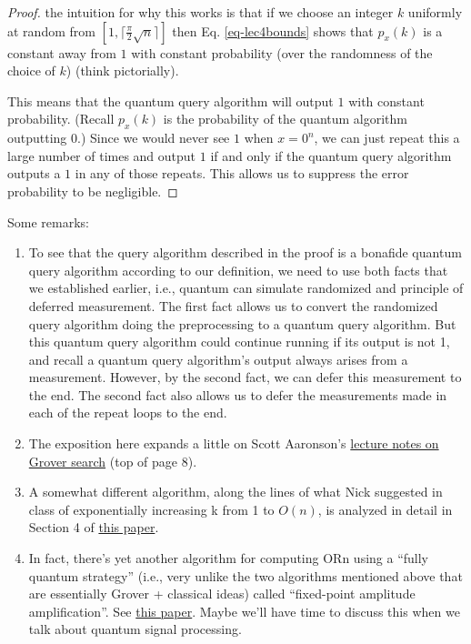 \begin{proof}
    the intuition for why this works is that if we choose an integer $k$ uniformly at random from $[1, \lceil \frac{\pi}{2}\sqrt{n} \rceil]$ then Eq. \eqref{eq-lec4bounds} shows that $p_x(k)$ is a constant away from $1$ with constant probability (over the randomness of the choice of $k$) (think pictorially).
    
    This means that the quantum query algorithm will output $1$ with constant probability. (Recall $p_x(k)$ is the probability of the quantum algorithm outputting $0$.) Since we would never see $1$ when $x = 0^n$, we can just repeat this a large number of times and output $1$ if and only if the quantum query algorithm outputs a $1$ in any of those repeats. This allows us to suppress the error probability to be negligible.
\end{proof}

Some remarks:
\begin{enumerate}
    \item To see that the query algorithm described in the proof is a bonafide quantum query algorithm according to our definition, we need to use both facts that we established earlier, i.e., quantum can simulate randomized and principle of deferred measurement. The first fact allows us to convert the randomized query algorithm doing the preprocessing to a quantum query algorithm. But this quantum query algorithm could continue running if its output is not 1, and recall a quantum query algorithm's output always arises from a measurement. However, by the second fact, we can defer this measurement to the end. The second fact also allows us to defer the measurements made in each of the repeat loops to the end.
    \item The exposition here expands a little on Scott Aaronson’s \href{https://www.scottaaronson.com/qclec/22.pdf}{lecture notes on Grover search} (top of page 8).
    \item A somewhat different algorithm, along the lines of what Nick suggested in class of exponentially increasing k from 1 to $O(n)$, is analyzed in detail in Section 4 of \href{https://arxiv.org/pdf/quant-ph/9605034.pdf}{this paper}.
    \item In fact, there's yet another algorithm for computing ORn using a “fully quantum strategy” (i.e., very unlike the two algorithms mentioned above that are essentially Grover + classical ideas) called “fixed-point amplitude amplification”. See \href{https://arxiv.org/abs/1409.3305}{this paper}. Maybe we'll have time to discuss this when we talk about quantum signal processing.
\end{enumerate}

